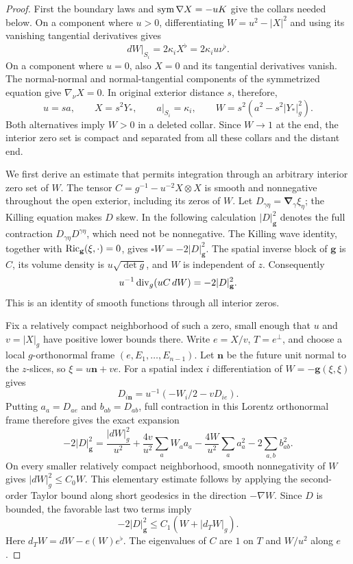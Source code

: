 \begin{proof}
First the boundary laws and $\operatorname{sym}\nabla X=-uK$ give the collars
needed below.  On a component where $u>0$, differentiating
$W=u^2-|X|^2$ and using its vanishing tangential derivatives gives
\begin{equation}\label{eq:static:common-positive-collar}
 dW|_{S_i}=2\kappa_iX^\flat=2\kappa_i u\nu^\flat.
\end{equation}
On a component where $u=0$, also $X=0$ and its tangential
derivatives vanish.  The normal-normal and normal-tangential
components of the symmetrized equation give $\nabla_\nu X=0$.
In original exterior distance $s$, therefore,
\begin{equation}\label{eq:static:common-zero-collar}
 u=sa,\qquad X=s^2Y_*,\qquad a|_{S_i}=\kappa_i,\qquad
 W=s^2(a^2-s^2|Y_*|_g^2).
\end{equation}
Both alternatives imply $W>0$ in a deleted collar.  Since $W\to1$
at the end, the interior zero set is compact and separated from
all these collars and the distant end.

We first derive an estimate that permits integration through an arbitrary
interior zero set of $W$. The tensor $C=g^{-1}-u^{-2}X\otimes X$ is
smooth and nonnegative throughout the open exterior, including its
zeros of $W$. Let
$D_{\gamma\eta}=\boldsymbol\nabla_\gamma\xi_\eta$; the Killing
equation makes $D$ skew. In the following calculation
$|D|_{\mathbf g}^2$ denotes the full contraction
$D_{\gamma\eta}D^{\gamma\eta}$, which need not be nonnegative.
The Killing wave identity, together with
$\operatorname{Ric}_{\mathbf g}(\xi,\cdot)=0$, gives
$\boldsymbol\square W=-2|D|_{\mathbf g}^2$. The spatial inverse
block of $\mathbf g$ is $C$, its volume density is
$u\sqrt{\det g}$, and $W$ is independent of $z$. Consequently
\begin{equation}\label{eq:static:wave}
 u^{-1}\operatorname{div}_g(uC\,dW)=-2|D|_{\mathbf g}^2.
\end{equation}
This is an identity of smooth functions through all interior zeros.

Fix a relatively compact neighborhood of such a zero, small enough
that $u$ and $v=|X|_g$ have positive lower bounds there. Write
$e=X/v$, $T=e^\perp$, and choose a local $g$-orthonormal frame
$(e,E_1,\ldots,E_{n-1})$. Let $\mathbf n$ be the future unit normal
to the $z$-slices, so $\xi=u\mathbf n+ve$.
For a spatial index $i$ differentiation of $W=-\mathbf g(\xi,\xi)$
gives
\[
 D_{i\mathbf n}=u^{-1}(-W_i/2-vD_{ie}).
\]
Putting $a_a=D_{ae}$ and $b_{ab}=D_{ab}$, full contraction in this
Lorentz orthonormal frame therefore gives the exact expansion
\[
 -2|D|_{\mathbf g}^2
 =\frac{|dW|_g^2}{u^2}
   +\frac{4v}{u^2}\sum_a W_a a_a
   -\frac{4W}{u^2}\sum_a a_a^2
   -2\sum_{a,b}b_{ab}^2.
\]
On every smaller relatively compact neighborhood, smooth
nonnegativity of $W$ gives $|dW|_g^2\leq C_0W$. This elementary
estimate follows by applying the second-order Taylor bound along
short geodesics in the direction $-\nabla W$. Since $D$ is bounded,
the favorable last two terms imply
\[
 -2|D|_{\mathbf g}^2\leq C_1(W+|d_TW|_g).
\]
Here $d_TW=dW-e(W)e^\flat$. The eigenvalues of $C$ are $1$ on
$T$ and $W/u^2$ along $e$.


\end{proof}
